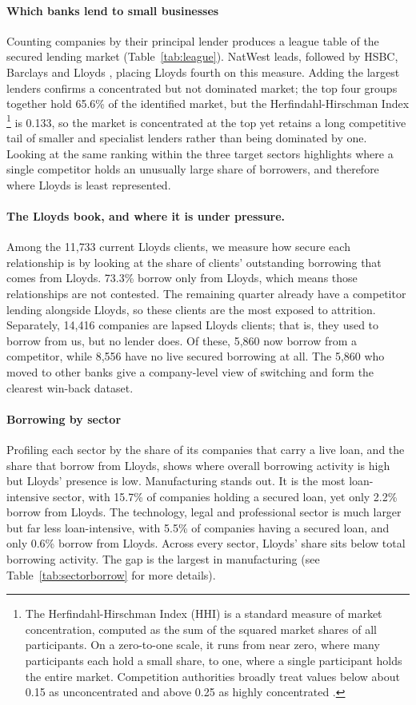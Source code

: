 \documentclass[    author={Samuel Menon Demelo; Sneha Saphala Ram Prasad; 
Viktor Ander Lindholm; Vishal Khatri},
               supervisor={Prof. Fernando Moreno-Pino},
                   degree={MSc},
                    title={Lloyds Commercial Banking Intelligence},
                 subtitle={Ranking SME Lending, Risk and Growth Prospects for Lloyds Banking Group},
                     type={},
                     year={2026}]{dissertation}
\begin{document}
\paragraph{Which banks lend to small businesses}
Counting companies by their principal lender produces a league table of the secured lending market (Table~\ref{tab:league}). NatWest leads, followed by HSBC, Barclays and Lloyds \cite{lbg_brands}, placing Lloyds fourth on this measure. Adding the largest lenders confirms a concentrated but not dominated market; the top four groups together hold 65.6\%  of the identified market, but the Herfindahl-Hirschman Index \footnote{The Herfindahl-Hirschman Index (HHI) is a standard measure of market concentration, computed as the sum of the squared market shares of all participants. On a zero-to-one scale, it runs from near zero, where many participants each hold a small share, to one, where a single participant holds the entire market. Competition authorities broadly treat values below about 0.15 as unconcentrated and above 0.25 as highly concentrated \cite{doj_hhi}.} is 0.133, so the market is concentrated at the top yet retains a long competitive tail of smaller and specialist lenders rather than being dominated by one. Looking at the same ranking within the three target sectors highlights where a single competitor holds an unusually large share of borrowers, and therefore where Lloyds is least represented.\\

\paragraph{The Lloyds book, and where it is under pressure.}
Among the 11{,}733 current Lloyds clients, we measure how secure each relationship is by looking at the share of clients' outstanding borrowing that comes from Lloyds. 73.3\% borrow only from Lloyds, which means those relationships are not contested. The remaining quarter already have a competitor lending alongside Lloyds, so these clients are the most exposed to attrition. Separately, 14,416 companies are lapsed Lloyds clients; that is, they used to borrow from us, but no lender does. Of these, 5,860 now borrow from a competitor, while 8,556 have no live secured borrowing at all. The 5,860 who moved to other banks give a company-level view of switching and form the clearest win-back dataset.

\paragraph{Borrowing by sector}
Profiling each sector by the share of its companies that carry a live loan, and the share that borrow from Lloyds, shows where overall borrowing activity is high but Lloyds' presence is low. Manufacturing stands out. It is the most loan-intensive sector, with 15.7\% of companies holding a secured loan, yet only 2.2\% borrow from Lloyds. The technology, legal and professional sector is much larger but far less loan-intensive, with 5.5\% of companies having a secured loan, and only 0.6\% borrow from Lloyds. Across every sector, Lloyds' share sits below total borrowing activity. The gap is the largest in manufacturing (see Table~\ref{tab:sectorborrow} for more details).
\end{document}
